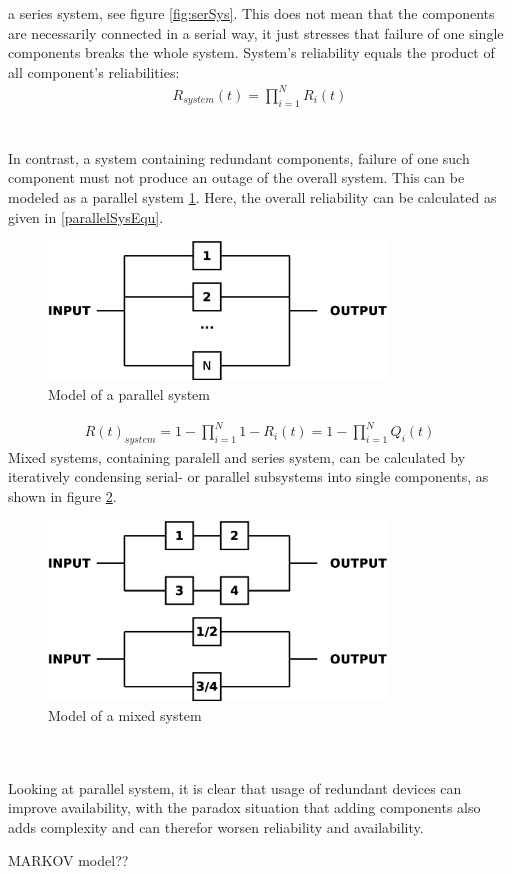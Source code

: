 a series system, see figure \ref{fig:serSys}. This does not mean that the components are necessarily connected in a serial way, it just stresses that failure
of one single components breaks the whole system. System's reliability equals the product of all component's reliabilities:
\begin{align}
R_{system}(t) = \prod_{i=1}^{N} R_{i}(t) 
\end{align}
\\
\\
In contrast, a system containing redundant components, failure of one such component must not produce an outage of the overall system. This can be modeled as
a parallel system \ref{fig:parallelSys}. Here, the overall reliability can be calculated as given in \ref{parallelSysEqu}.
\begin{figure}
    \centering
    \includegraphics[width=0.8\textwidth]{figures/parallelSys.eps}
    \caption{Model of a parallel system}
    \label{fig:parallelSys}
\end{figure}

\begin{align}\label{parallelSysEqu}
 R(t)_{system} = 1 - \prod_{i=1}^{N} 1- R_{i}(t) = 1 - \prod_{i=1}^{N} Q_{i}(t)
\end{align}
Mixed systems, containing paralell and series system, can be calculated by iteratively condensing serial- or parallel subsystems into single components,
as shown in figure \ref{fig:mixedSys}.
\begin{figure}
    \centering
    \includegraphics[width=0.8\textwidth]{figures/mixedSys.eps}
    \caption{Model of a mixed system}
    \label{fig:mixedSys}
\end{figure}
\\
\\
Looking at parallel system, it is clear that usage of redundant devices can improve availability, with the paradox situation that adding components also adds
complexity and can therefor worsen reliability and availability.


MARKOV model??